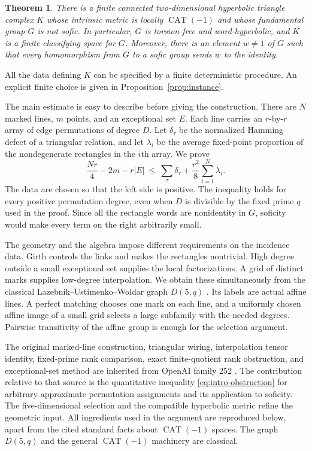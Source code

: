 \documentclass[11pt]{amsart}
\newtheorem{theorem}{Theorem}[section]
\theoremstyle{definition}
\theoremstyle{remark}
\numberwithin{equation}{section}
\newcommand{\CAT}{\operatorname{CAT}}
\begin{document}
\begin{theorem}\label{thm:main}
There is a finite connected two-dimensional hyperbolic triangle
complex $K$ whose intrinsic metric is locally $\CAT(-1)$ and whose
fundamental group $G$ is not sofic. In particular, $G$ is torsion-free
and word-hyperbolic, and $K$ is a finite classifying space for $G$.
Moreover, there is an element $w\ne 1$ of $G$ such that every
homomorphism from $G$ to a sofic group sends $w$ to the identity.
\end{theorem}

All the data defining $K$ can be specified by a finite deterministic
procedure. An explicit finite choice is given in
Proposition~\ref{prop:instance}.

The main estimate is easy to describe before giving the construction.
There are $N$ marked lines, $m$ points, and an exceptional set $E$.
Each line carries an $r$-by-$r$ array of edge permutations of degree $D$. Let
$\delta_\tau$ be the normalized Hamming defect of a triangular
relation, and let $\lambda_i$ be the average fixed-point proportion
of the nondegenerate rectangles in the $i$th array. We prove
\begin{equation}\label{eq:intro-obstruction}
 \frac{Nr}{4}-2m-r|E|
 \ \le\ \sum_\tau\delta_\tau
             +\frac{r^2}{8}\sum_{i=1}^N\lambda_i.
\end{equation}
The data are chosen so that the left side is positive. The inequality
holds for every positive permutation degree, even when $D$ is
divisible by the fixed prime $q$ used in the proof. Since all the
rectangle words are nonidentity in
$G$, soficity would make every term on the right arbitrarily small.

The geometry and the algebra impose different requirements on the
incidence data. Girth controls the links and makes the rectangles
nontrivial. High degree outside a small exceptional set supplies the
local factorizations. A grid of distinct marks supplies low-degree
interpolation. We obtain these simultaneously from the classical
Lazebnik--Ustimenko--Woldar graph $D(5,q)$ \cite{LUW}. Its labels are
actual affine lines. A perfect matching chooses one mark on each
line, and a uniformly chosen affine image of a small grid selects a
large subfamily with the needed degrees. Pairwise transitivity of
the affine group is enough for the selection argument.

The original marked-line construction, triangular wiring,
interpolation tensor identity, fixed-prime rank comparison,
exact finite-quotient rank obstruction, and exceptional-set method
are inherited from OpenAI family 252 \cite[Section~2]{OA252}.
The contribution
relative to that source is the quantitative inequality
\eqref{eq:intro-obstruction} for arbitrary approximate permutation
assignments and its application to soficity. The five-dimensional
selection and the compatible hyperbolic metric refine the geometric
input. All ingredients used in the argument are reproduced below,
apart from the cited standard facts about $\CAT(-1)$ spaces.
The graph $D(5,q)$ and the general $\CAT(-1)$ machinery are classical.
\end{document}
